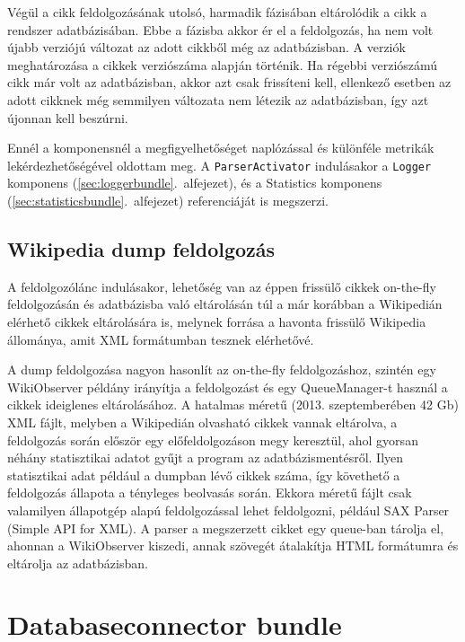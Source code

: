 Végül a cikk feldolgozásának utolsó, harmadik fázisában eltárolódik a cikk a rendszer adatbázisában. Ebbe a fázisba akkor ér el a feldolgozás, ha nem volt újabb verziójú változat az adott cikkből még az adatbázisban. A verziók meghatározása a cikkek verziószáma alapján történik. Ha régebbi verziószámú cikk már volt az adatbázisban, akkor azt csak frissíteni kell, ellenkező esetben az adott cikknek még semmilyen változata nem létezik az adatbázisban, így azt újonnan kell beszúrni.

Ennél a komponensnél a  megfigyelhetőséget naplózással és különféle metrikák lekérdezhetőségével oldottam meg. A \texttt{ParserActivator} indulásakor a \texttt{Logger} komponens (\ref{sec:loggerbundle}.~alfejezet), és a Statistics komponens (\ref{sec:statisticsbundle}.~alfejezet) referenciáját is megszerzi.

\subsection{Wikipedia dump feldolgozás}
\label{sub:dumpprocessing}

A feldolgozólánc indulásakor, lehetőség van az éppen frissülő cikkek on-the-fly feldolgozásán és adatbázisba való eltárolásán túl a már korábban a Wikipedián elérhető cikkek eltárolására is, melynek forrása a havonta frissülő Wikipedia állománya, amit XML formátumban tesznek elérhetővé.

A dump feldolgozása nagyon hasonlít az on-the-fly feldolgozáshoz, szintén egy WikiObserver példány irányítja a feldolgozást és egy QueueManager-t használ a cikkek ideiglenes eltárolásához. A hatalmas méretű (2013. szeptemberében 42 Gb) XML fájlt, melyben a Wikipedián olvasható cikkek vannak eltárolva, a feldolgozás során először egy előfeldolgozáson megy keresztül, ahol gyorsan néhány statisztikai adatot gyűjt a program az adatbázismentésről. Ilyen statisztikai adat például a dumpban lévő cikkek száma, így követhető a feldolgozás állapota a tényleges beolvasás során. Ekkora méretű fájlt csak valamilyen állapotgép alapú feldolgozással lehet feldolgozni, például SAX Parser (Simple API for XML). A parser a megszerzett cikket egy queue-ban tárolja el, ahonnan a WikiObserver kiszedi, annak szövegét átalakítja HTML formátumra és eltárolja az adatbázisban.



\section{Databaseconnector bundle}
\label{sec:dbconnectorbundle}
    

